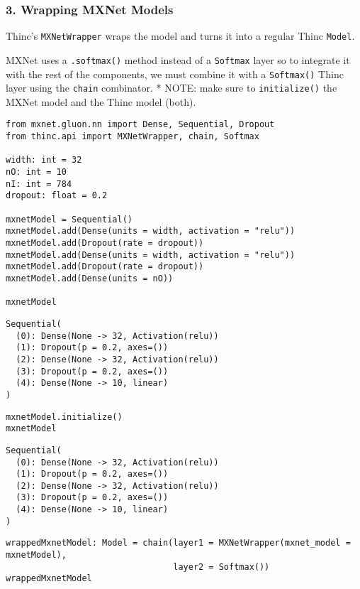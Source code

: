\documentclass[
]{article}
\begin{document}
\hypertarget{wrapping-mxnet-models}{%
\subsubsection{3. Wrapping MXNet Models}\label{wrapping-mxnet-models}}

Thinc's \texttt{MXNetWrapper} wraps the model and turns it
into a regular Thinc \texttt{Model}.

MXNet uses a \texttt{.softmax()} method instead of a
\texttt{Softmax} layer so to integrate it with the rest of
the components, we must combine it with a
\texttt{Softmax()} Thinc layer using the
\texttt{chain} combinator. * NOTE: make sure to
\texttt{initialize()} the MXNet model and the Thinc model
(both).

\begin{verbatim}
from mxnet.gluon.nn import Dense, Sequential, Dropout
from thinc.api import MXNetWrapper, chain, Softmax

width: int = 32
nO: int = 10
nI: int = 784
dropout: float = 0.2

mxnetModel = Sequential()
mxnetModel.add(Dense(units = width, activation = "relu"))
mxnetModel.add(Dropout(rate = dropout))
mxnetModel.add(Dense(units = width, activation = "relu"))
mxnetModel.add(Dropout(rate = dropout))
mxnetModel.add(Dense(units = nO))

mxnetModel
\end{verbatim}

\begin{verbatim}
Sequential(
  (0): Dense(None -> 32, Activation(relu))
  (1): Dropout(p = 0.2, axes=())
  (2): Dense(None -> 32, Activation(relu))
  (3): Dropout(p = 0.2, axes=())
  (4): Dense(None -> 10, linear)
)
\end{verbatim}

\begin{verbatim}
mxnetModel.initialize()
mxnetModel
\end{verbatim}

\begin{verbatim}
Sequential(
  (0): Dense(None -> 32, Activation(relu))
  (1): Dropout(p = 0.2, axes=())
  (2): Dense(None -> 32, Activation(relu))
  (3): Dropout(p = 0.2, axes=())
  (4): Dense(None -> 10, linear)
)
\end{verbatim}

\begin{verbatim}
wrappedMxnetModel: Model = chain(layer1 = MXNetWrapper(mxnet_model = mxnetModel),
                                 layer2 = Softmax())
wrappedMxnetModel
\end{verbatim}
\end{document}
